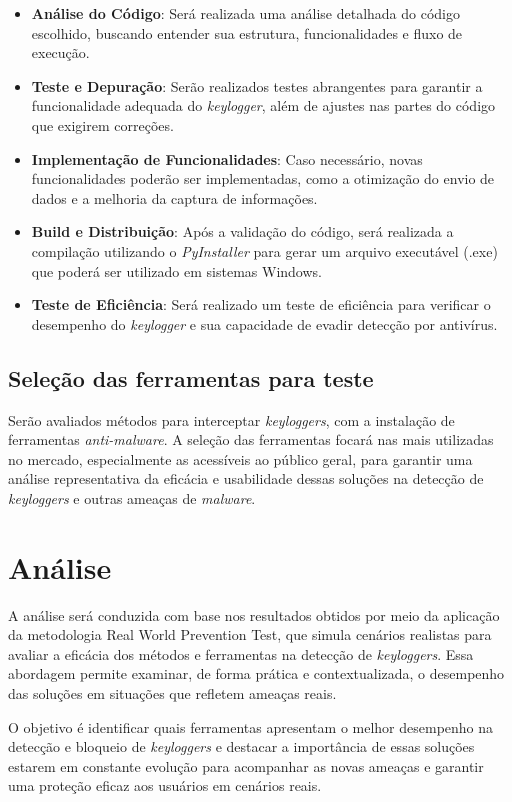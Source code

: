 \documentclass[12pt]{article}
\begin{document}
\begin{itemize}
    \item \textbf{Análise do Código}: Será realizada uma análise detalhada do código escolhido, buscando entender sua estrutura, funcionalidades e fluxo de execução.
    \item \textbf{Teste e Depuração}: Serão realizados testes abrangentes para garantir a funcionalidade adequada do \textit{keylogger}, além de ajustes nas partes do código que exigirem correções.
    \item \textbf{Implementação de Funcionalidades}: Caso necessário, novas funcionalidades poderão ser implementadas, como a otimização do envio de dados e a melhoria da captura de informações.
    \item \textbf{Build e Distribuição}: Após a validação do código, será realizada a compilação utilizando o \textit{PyInstaller} para gerar um arquivo executável (.exe) que poderá ser utilizado em sistemas Windows.
    \item \textbf{Teste de Eficiência}: Será realizado um teste de eficiência para verificar o desempenho do \textit{keylogger} e sua capacidade de evadir detecção por antivírus.
\end{itemize}

\subsection{Seleção das ferramentas para teste}
Serão avaliados métodos para interceptar \textit{keyloggers}, com a instalação de ferramentas \textit{anti-malware}. A seleção das ferramentas focará nas mais utilizadas no mercado, especialmente as acessíveis ao público geral, para garantir uma análise representativa da eficácia e usabilidade dessas soluções na detecção de \textit{keyloggers} e outras ameaças de \textit{malware}.

\section{Análise}
A análise será conduzida com base nos resultados obtidos por meio da aplicação da metodologia Real World Prevention Test, que simula cenários realistas para avaliar a eficácia dos métodos e ferramentas na detecção de \textit{keyloggers}. Essa abordagem permite examinar, de forma prática e contextualizada, o desempenho das soluções em situações que refletem ameaças reais.

O objetivo é identificar quais ferramentas apresentam o melhor desempenho na detecção e bloqueio de \textit{keyloggers} e destacar a importância de essas soluções estarem em constante evolução para acompanhar as novas ameaças e garantir uma proteção eficaz aos usuários em cenários reais.
\end{document}
